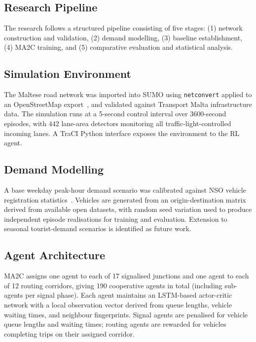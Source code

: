 \documentclass[conference]{IEEEtran}
\begin{document}
\subsection{Research Pipeline}

The research follows a structured pipeline consisting of five stages:
(1) network construction and validation, (2) demand modelling,
(3) baseline establishment, (4) MA2C training, and (5) comparative
evaluation and statistical analysis.

\subsection{Simulation Environment}

The Maltese road network was imported into SUMO using \texttt{netconvert} applied
to an OpenStreetMap export~\cite{lopez2018}, and validated against Transport
Malta infrastructure data. The simulation runs at a 5-second control interval
over 3600-second episodes, with 442 lane-area detectors monitoring all
traffic-light-controlled incoming lanes. A TraCI Python interface exposes the
environment to the RL agent.

\subsection{Demand Modelling}

A base weekday peak-hour demand scenario was calibrated against NSO vehicle
registration statistics~\cite{nso2024}. Vehicles are generated from an
origin-destination matrix derived from available open datasets, with random seed
variation used to produce independent episode realisations for training and
evaluation. Extension to seasonal tourist-demand scenarios is identified as
future work.

\subsection{Agent Architecture}

MA2C assigns one agent to each of 17 signalised junctions and one agent to each
of 12 routing corridors, giving 190 cooperative agents in total (including
sub-agents per signal phase). Each agent maintains an LSTM-based actor-critic
network with a local observation vector derived from queue lengths, vehicle
waiting times, and neighbour fingerprints. Signal agents are penalised for
vehicle queue lengths and waiting times; routing agents are rewarded for vehicles
completing trips on their assigned corridor.
\end{document}
